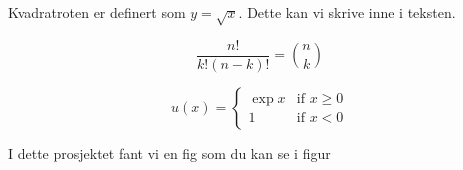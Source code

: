 \documentclass[a4paper]{article}
\begin{document}
Kvadratroten er definert som $y = \sqrt{x}$. Dette kan vi skrive inne i teksten.

\begin{equation*} \label{eq:combinatorics}
		\frac{n!}{k!(n-k)!} = \binom{n}{k}
\end{equation*}


\begin{equation}

		u(x) =
				\begin{cases}
						\exp{x} & \text{if } x \geq 0 \\
						1 & \text{if } x < 0
				\end{cases}

\end{equation}

I dette prosjektet fant vi en fig som du kan se i figur %


% 
% 
\end{document}
